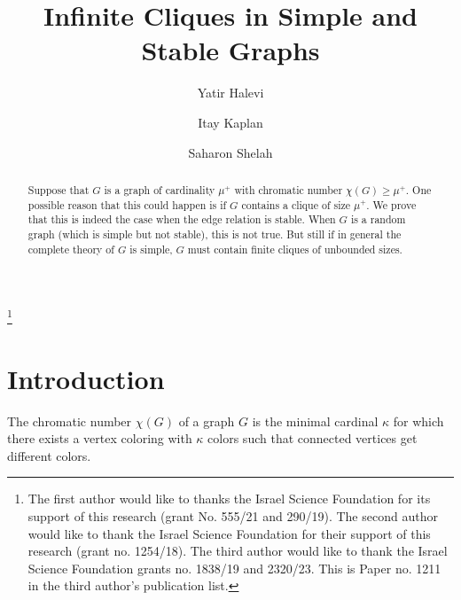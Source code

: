 \documentclass[a4paper]{amsart}
\theoremstyle{plain}
\theoremstyle{definition}
\theoremstyle{remark}
\numberwithin{equation}{section}
\begin{document}
\title{Infinite Cliques in Simple and Stable Graphs}

\author{Yatir Halevi}
\address{Department of Mathematics\\ University of Haifa\\ 199 Abba Khoushy Avenue \\ Haifa \\Israel}

\author{Itay Kaplan}
\address{Einstein Institute of Mathematics, Hebrew University of Jerusalem, 91904, Jerusalem
Israel.}

\author{Saharon Shelah}
\address{Einstein Institute of Mathematics, Hebrew University of Jerusalem, 91904, Jerusalem
Israel.}

\thanks{The first author would like to thanks the Israel Science Foundation for its support of this research (grant No. 555/21 and 290/19). The second author would like to thank the Israel Science Foundation for their support of this research (grant no. 1254/18). The third author would like to thank the Israel Science Foundation grants no. 1838/19 and  2320/23. This is Paper no. 1211 in the third author's  publication list.}


\begin{abstract}
  Suppose that $G$ is a graph of cardinality $\mu^+$ with  chromatic number $\chi(G)\geq \mu^+$. One possible reason that this could happen is if $G$ contains a clique of size $\mu^+$. We prove that this is indeed the case when the edge relation is stable. When $G$ is a random graph (which is simple but not stable), this is not true. But still if in general the complete theory of $G$ is simple, $G$ must contain finite cliques of unbounded sizes.
\end{abstract}
  

\maketitle

\section{Introduction}
The chromatic number $\chi(G)$ of a graph $G$ is the minimal cardinal $\kappa$ for which there exists a vertex coloring with $\kappa$ colors such that connected vertices get different colors. 
\end{document}
